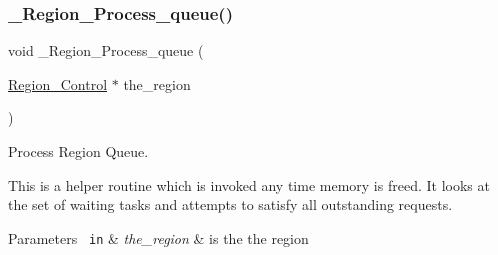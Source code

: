 \subsubsection{\texorpdfstring{\_Region\_Process\_queue()}{\_Region\_Process\_queue()}}
{\footnotesize\ttfamily void \+\_\+\+Region\+\_\+\+Process\+\_\+queue (\begin{DoxyParamCaption}\item[{\mbox{\hyperlink{structRegion__Control}{Region\+\_\+\+Control}} $\ast$}]{the\+\_\+region }\end{DoxyParamCaption})}



Process Region Queue. 

This is a helper routine which is invoked any time memory is freed. It looks at the set of waiting tasks and attempts to satisfy all outstanding requests.


\begin{DoxyParams}[1]{Parameters}
\mbox{\texttt{ in}}  & {\em the\+\_\+region} & is the the region \\
\hline
\end{DoxyParams}
